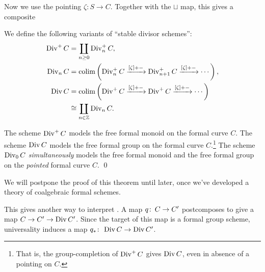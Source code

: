 Now we use the pointing $\zeta: S \to C$.  Together with the $\sqcup$ map, this gives a composite
\begin{center}
\end{center}

\begin{definition}\label{StableDivisorSchemeDefn}
We define the following variants of ``stable divisor schemes'':
\begin{align*}
\operatorname{Div}^+ C & = \coprod_{n \ge 0} \operatorname{Div}_n^+ C, \\
\operatorname{Div}_n C & = \operatorname*{colim} \left( \operatorname{Div}_n^+ C \xrightarrow{[\zeta] + -} \operatorname{Div}_{n+1}^+ C \xrightarrow{[\zeta] + -} \cdots \right), \\
\operatorname{Div} C & = \operatorname*{colim} \left( \operatorname{Div}^+ C \xrightarrow{[\zeta] + -} \operatorname{Div}^+ C \xrightarrow{[\zeta] + -} \cdots \right) \\
& \cong \coprod_{n \in \mathbb Z} \operatorname{Div}_n C.
\end{align*}
\end{definition}

\begin{theorem}\label{DivConstructionsAreFree}
The scheme $\operatorname{Div}^+ C$ models the free formal monoid on the formal curve $C$.  The scheme $\operatorname{Div} C$ models the free formal group on the formal curve $C$.\footnote{That is, the group-completion of $\operatorname{Div}^+ C$ gives $\operatorname{Div} C$, even in absence of a pointing on $C$.}  The scheme $\operatorname{Div}_0 C$ \emph{simultaneously} models the free formal monoid and the free formal group on the \emph{pointed} formal curve $C$. \qed {}
\end{theorem}
\noindent We will postpone the proof of this theorem until later, once we've developed a theory of coalgebraic formal schemes.

\begin{remark}
This gives another way to interpret .  A map $q\colon\thinspace C \to C'$ postcomposes to give a map $C \to C' \to \operatorname{Div} C'$.  Since the target of this map is a formal group scheme, universality induces a map $q_*\colon\thinspace \operatorname{Div} C \to \operatorname{Div} C'$.
\end{remark}


